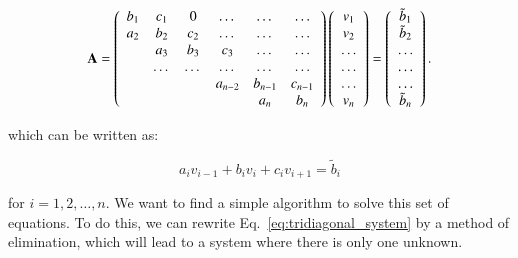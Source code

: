 \documentclass{article}
\begin{document}
\begin{multicols}{2}
\begin{equation}
    {\bf A} = \left(\begin{array}{cccccc}
                           b_1& c_1 & 0 &\dots   & \dots &\dots \\
                           a_2 & b_2 & c_2 &\dots &\dots &\dots \\
                           & a_3 & b_3 & c_3 & \dots & \dots \\
                           & \dots   & \dots &\dots   &\dots & \dots \\
                           &   &  &a_{n-2}  &b_{n-1}& c_{n-1} \\
                           &    &  &   &a_n & b_n \\
                      \end{array} \right)\left(\begin{array}{c}
                           v_1\\
                           v_2\\
                           \dots \\
                          \dots  \\
                          \dots \\
                           v_n\\
                      \end{array} \right)
  =\left(\begin{array}{c}
                           \tilde{b}_1\\
                           \tilde{b}_2\\
                           \dots \\
                           \dots \\
                          \dots \\
                           \tilde{b}_n\\
                      \end{array} \right).
\end{equation}

\noindent which can be written as:

\begin{equation}\label{eq:tridiagonal_system}
  a_iv_{i-1}+b_iv_i+c_iv_{i+1} = \tilde{b}_i
\end{equation}

\noindent for $i=1,2,\dots,n$. We want to find a simple algorithm to solve this set of equations. To do this, we can rewrite Eq.~\ref{eq:tridiagonal_system} by a method of elimination, which will lead to a system where there is only one unknown. 


\end{multicols}
\end{document}
